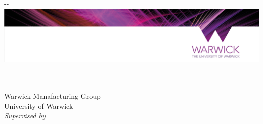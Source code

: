 \makeatletter
\begin{titlepage}

    \vspace*{-1.45in}

    \begin{adjustwidth}{-\oddsidemargin-1in}{-\rightmargin}
        \centering
        \hspace*{-1mm}
        \includegraphics[width=\paperwidth]{aux/head.jpeg}
    \end{adjustwidth}

    \vspace*{1.5in}

    \textbf{\Huge \@title} \\ [2cm]

    \Large \textbf{\@author} \\ [1cm]
    Warwick Manafacturing Group \\
    University of Warwick \\

    \emph{Supervised by \@supervisor} \\

    \vfill

\end{titlepage}
\makeatother
